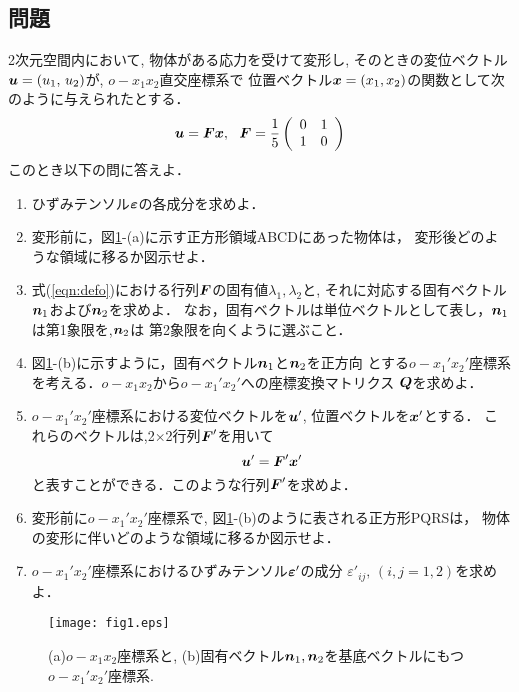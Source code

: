 \documentclass[10pt,a4j]{jbook}
\begin{document}
\subsection{問題}
2次元空間内において, 物体がある応力を受けて変形し, 
そのときの変位ベクトル$\mbox{\boldmath $u$}=(u_1, \, u_2)$が, $o-x_1x_2$直交座標系で
位置ベクトル$\mbox{\boldmath $x$}=(x_1, x_2)$の関数として次のように与えられたとする．
\begin{equation}
	\fat{u}
	=
	\fat{F}\fat{x}
	, \ \ 
	\fat{F}=
	\frac{1}{5}
	\left( 
		\begin{array}{cc}
		 0 & 1\\
		 1 & 0 
		\end{array}
	\right)
	\label{eqn:defo}
\end{equation}
このとき以下の問に答えよ．
\begin{enumerate}
\item
	ひずみテンソル$\mbox{\boldmath $\varepsilon$}$の各成分を求めよ．
\item
	変形前に，図\ref{fig:fig6_1}-(a)に示す正方形領域ABCDにあった物体は，
	変形後どのような領域に移るか図示せよ．
\item
	式(\ref{eqn:defo})における行列$\mbox{\boldmath $F$}$の固有値$\lambda_1, \lambda_2$と, 
	それに対応する固有ベクトル$\mbox{\boldmath $n$}_1$および$\mbox{\boldmath $n$}_2$を求めよ．	
	なお，固有ベクトルは単位ベクトルとして表し，$\mbox{\boldmath $n$}_1$は第1象限を,$\mbox{\boldmath $n$}_2$は
	第2象限を向くように選ぶこと．
\item
	図\ref{fig:fig6_1}-(b)に示すように，固有ベクトル$\mbox{\boldmath $n$}_1$と$\mbox{\boldmath $n$}_2$を正方向
	とする$o-x_1'x_2'$座標系を考える．$o-x_1x_2$から$o-x_1'x_2'$への座標変換マトリクス
	$\mbox{\boldmath $Q$}$を求めよ．
\item
	$o-x_1'x_2'$座標系における変位ベクトルを$\mbox{\boldmath $u$}'$, 位置ベクトルを$\mbox{\boldmath $x$}'$とする．
	これらのベクトルは,2$\times$2行列$\mbox{\boldmath $F$}'$を用いて
	\[
		\mbox{\boldmath $u$}'=\mbox{\boldmath $F$}'\mbox{\boldmath $x$}'
	\]
	と表すことができる．このような行列$\mbox{\boldmath $F$}'$を求めよ．
\item
	変形前に$o-x_1'x_2'$座標系で, 図\ref{fig:fig6_1}-(b)のように表される正方形PQRSは，
	物体の変形に伴いどのような領域に移るか図示せよ．
\item
	$o-x_1'x_2'$座標系におけるひずみテンソル$\mbox{\boldmath $\varepsilon$}'$の成分
	$\varepsilon'_{ij}, \, (i,j=1,2)$を求めよ．
\end{enumerate}
\begin{figure}[h]
	\begin{center}
	\texttt{[image: fig1.eps]} 
	\end{center}
	\caption{(a)$o-x_1x_2$座標系と, (b)固有ベクトル$\mbox{\boldmath $n$}_1,\mbox{\boldmath $n$}_2$を基底ベクトルにもつ$o-x_1'x_2'$座標系.} 
	\label{fig:fig6_1}
\end{figure}

\end{document}
